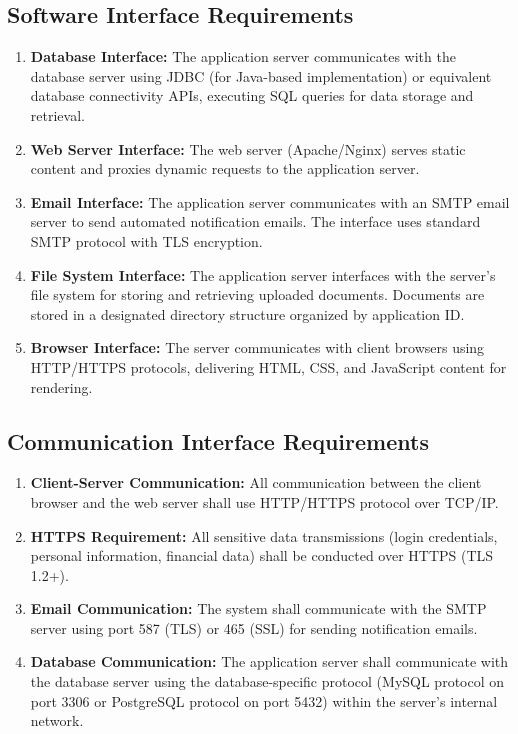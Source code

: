 \documentclass[12pt,a4paper,oneside]{report}
\begin{document}
\subsection{Software Interface Requirements}

\begin{enumerate}
  \item \textbf{Database Interface:} The application server communicates with the database server using JDBC (for Java-based implementation) or equivalent database connectivity APIs, executing SQL queries for data storage and retrieval.
  \item \textbf{Web Server Interface:} The web server (Apache/Nginx) serves static content and proxies dynamic requests to the application server.
  \item \textbf{Email Interface:} The application server communicates with an SMTP email server to send automated notification emails. The interface uses standard SMTP protocol with TLS encryption.
  \item \textbf{File System Interface:} The application server interfaces with the server's file system for storing and retrieving uploaded documents. Documents are stored in a designated directory structure organized by application ID.
  \item \textbf{Browser Interface:} The server communicates with client browsers using HTTP/HTTPS protocols, delivering HTML, CSS, and JavaScript content for rendering.
\end{enumerate}

\subsection{Communication Interface Requirements}

\begin{enumerate}
  \item \textbf{Client-Server Communication:} All communication between the client browser and the web server shall use HTTP/HTTPS protocol over TCP/IP.
  \item \textbf{HTTPS Requirement:} All sensitive data transmissions (login credentials, personal information, financial data) shall be conducted over HTTPS (TLS 1.2+).
  \item \textbf{Email Communication:} The system shall communicate with the SMTP server using port 587 (TLS) or 465 (SSL) for sending notification emails.
  \item \textbf{Database Communication:} The application server shall communicate with the database server using the database-specific protocol (MySQL protocol on port 3306 or PostgreSQL protocol on port 5432) within the server's internal network.
\end{enumerate}
\end{document}
